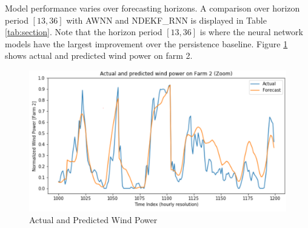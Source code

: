 \documentclass[conference]{IEEEtran}
\begin{document}
Model performance varies over forecasting horizons. %
A comparison over horizon period $[13, 36]$ with AWNN \cite{7894735} and NDEKF\_RNN \cite{Kanna13} is displayed in Table \ref{tab:section}. Note that the horizon period $[13,36]$ is where the neural network models have the largest improvement over the persistence baseline. Figure \ref{fig:actual} shows actual and predicted wind power on farm 2.


\begin{table}[ht]
\caption {Prediction error over horizon period $[13,36]$}
\begin{center}
\label{tab:section}
\end{center}
\vspace*{-5mm}
\end{table}

\begin{figure}[t]
\centering
\includegraphics[width=0.85\columnwidth]{FIG/actualzoom}
\caption{Actual and Predicted Wind Power}
\label{fig:actual}
\vspace*{-3mm}
\end{figure}
\end{document}
